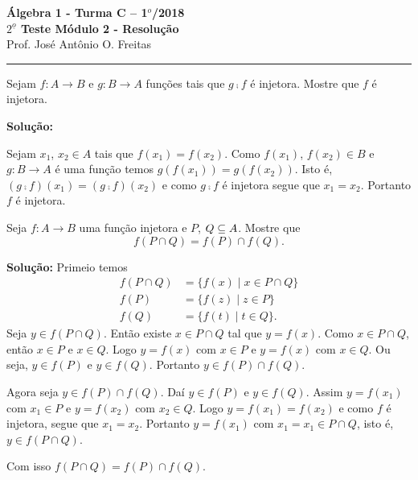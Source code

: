 \documentclass[12pt]{article}
\begin{document}


\begin{center}
{\Large\bf {\'A}lgebra 1 - Turma C -- 1$^{o}$/2018} \\ \vspace{9pt} {\large\bf
  $2^{\underline{o}}$ Teste Módulo 2 - Resolu\c{c}\~ao}\\
\vspace{9pt} Prof. Jos{\'e} Ant{\^o}nio O. Freitas
\end{center}
\hrule

\vspace{.6cm}

\questao Sejam $f : A \to B$ e $g : B \to A$ funções tais que $g \comp f$ é injetora. Mostre que $f$ é injetora.

\noindent\textbf{Solu\c{c}\~ao:}

	Sejam $x_1$, $x_2 \in A$ tais que $f(x_1) = f(x_2)$. Como $f(x_1)$, $f(x_2) \in B$ e $g : B \to A$ é uma função temos $g(f(x_1)) = g(f(x_2))$. Isto é, $(g \comp f)(x_1) = (g \comp f)(x_2)$ e como $g \comp f$ é injetora segue que $x_1 = x_2$. Portanto $f$ é injetora.

\vspace{.5cm}

\questao Seja $f : A \to B$ uma função injetora e $P$, $Q \subseteq A$. Mostre que
\[
	f(P \cap Q) = f(P) \cap f(Q).
\]

\noindent\textbf{Solu\c{c}\~ao:} Primeio temos
\begin{align*}
	f(P \cap Q) &= \{f(x) \mid x \in P \cap Q\}\\
	f(P) &= \{f(z) \mid z \in P\}\\
	f(Q) &= \{f(t) \mid t \in Q\}.
\end{align*}
Seja $y \in f(P \cap Q)$. Então existe $x \in P \cap Q$ tal que $y = f(x)$. Como $x \in P \cap Q$, então $x \in P$ e $x \in Q$. Logo $y = f(x)$ com $x \in P$ e $y = f(x)$ com $x \in Q$. Ou seja, $y \in f(P)$ e $y \in f(Q)$. Portanto $y \in f(P) \cap f(Q)$.

Agora seja $y \in f(P) \cap f(Q)$. Daí $y \in f(P)$ e $y \in f(Q)$. Assim $y = f(x_1)$ com $x_1 \in P$ e $y = f(x_2)$ com $x_2 \in Q$. Logo $y = f(x_1) = f(x_2)$ e como $f$ é injetora, segue que $x_1 = x_2$. Portanto $y = f(x_1)$ com $x_1 = x_1 \in P \cap Q$, isto é, $y \in f(P \cap Q)$.

Com isso $f(P \cap Q) = f(P) \cap f(Q)$.
\end{document}
